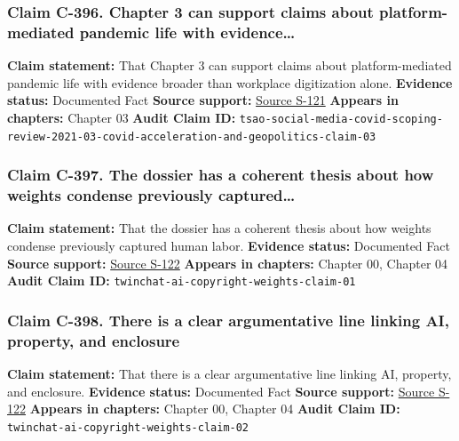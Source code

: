 \documentclass[
  american,
  11pt,
  letterpaper,
]{article}
\begin{document}
\subsubsection{Claim C-396. Chapter 3 can support claims about
platform-mediated pandemic life with
evidence\ldots{}}\label{claim-c-396-chapter-3-can-support-claims-about-platform-mediated-pandemic-life-with-evidence}

\textbf{Claim statement:} That Chapter 3 can support claims about
platform-mediated pandemic life with evidence broader than workplace
digitization alone. \textbf{Evidence status:} Documented Fact
\textbf{Source support:}
\hyperref[source-s-121-what-social-media-told-about-us-in-the-time-of-covid-19-a-scoping-review]{Source
S-121} \textbf{Appears in chapters:} Chapter 03 \textbf{Audit Claim ID:}
\texttt{tsao-social-media-covid-scoping-review-2021-03-covid-acceleration-and-geopolitics-claim-03}

\subsubsection{Claim C-397. The dossier has a coherent thesis about how
weights condense previously
captured\ldots{}}\label{claim-c-397-the-dossier-has-a-coherent-thesis-about-how-weights-condense-previously-captured}

\textbf{Claim statement:} That the dossier has a coherent thesis about
how weights condense previously captured human labor. \textbf{Evidence
status:} Documented Fact \textbf{Source support:}
\hyperref[source-s-122-ai-copyright-weights-a-new-frontier-in-intellectual-property-law]{Source
S-122} \textbf{Appears in chapters:} Chapter 00, Chapter 04
\textbf{Audit Claim ID:} \texttt{twinchat-ai-copyright-weights-claim-01}

\subsubsection{Claim C-398. There is a clear argumentative line linking
AI, property, and
enclosure}\label{claim-c-398-there-is-a-clear-argumentative-line-linking-ai-property-and-enclosure}

\textbf{Claim statement:} That there is a clear argumentative line
linking AI, property, and enclosure. \textbf{Evidence status:}
Documented Fact \textbf{Source support:}
\hyperref[source-s-122-ai-copyright-weights-a-new-frontier-in-intellectual-property-law]{Source
S-122} \textbf{Appears in chapters:} Chapter 00, Chapter 04
\textbf{Audit Claim ID:} \texttt{twinchat-ai-copyright-weights-claim-02}
\end{document}
